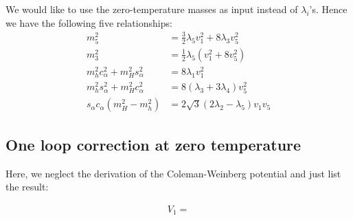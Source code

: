 \documentclass[12pt]{article}
\begin{document}
We would like to use the zero-temperature masses as input instead of $\lambda_i$'s. Hence we have the following five relationships:
\begin{subequations}
    \begin{align}
        m_5^2 &= \frac{3}{2}\lambda_5v_1^2 + 8\lambda_3 v_5^2\\
        m_3^2 &= \frac{1}{2}\lambda_5(v_1^2 + 8v_5^2) \\
        m_h^2c_\alpha^2 + m_H^2 s_\alpha^2 &= 8\lambda_1v_1^2 \\
        m_h^2s_\alpha^2 + m_H^2 c_\alpha^2 &= 8(\lambda_3+3\lambda_4)v_5^2\\
        s_\alpha c_\alpha (m_H^2 - m_h^2) &= 2\sqrt{3}(2\lambda_2-\lambda_5)v_1 v_5
    \end{align}
\end{subequations}

\subsection{One loop correction at zero temperature}

Here, we neglect the derivation of the Coleman-Weinberg potential and just list the result:

\begin{align}
    V_1 =
\end{align}




\end{document}
